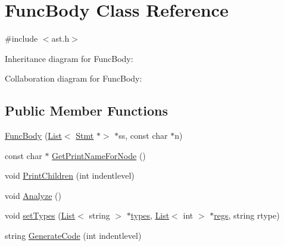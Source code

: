 \hypertarget{class_func_body}{}\section{Func\+Body Class Reference}
\label{class_func_body}


{\ttfamily \#include $<$ast.\+h$>$}



Inheritance diagram for Func\+Body\+:


Collaboration diagram for Func\+Body\+:
\subsection*{Public Member Functions}
\begin{DoxyCompactItemize}
\item 
\hyperlink{class_func_body_a13878f3d52215a31d38a6a593d29fe7a}{Func\+Body} (\hyperlink{class_list}{List}$<$ \hyperlink{class_stmt}{Stmt} $\ast$$>$ $\ast$ss, const char $\ast$n)
\item 
const char $\ast$ \hyperlink{class_func_body_ae2e7c93a201a73256289ecbb59455961}{Get\+Print\+Name\+For\+Node} ()
\item 
void \hyperlink{class_func_body_a6e42023a04da72f19901550f910b2e35}{Print\+Children} (int indentlevel)
\item 
void \hyperlink{class_func_body_a6114d98f4cd6e0341cb8662750266477}{Analyze} ()
\item 
void \hyperlink{class_func_body_a4a2fbd17eb33da81f2ec9d6ff7454463}{set\+Types} (\hyperlink{class_list}{List}$<$ string $>$ $\ast$\hyperlink{class_func_body_ab658c76bb42d23b067c1b1860ddcf9f9}{types}, \hyperlink{class_list}{List}$<$ int $>$ $\ast$\hyperlink{class_func_body_a48a90d46d3c6f767f1a6595c312af970}{regs}, string rtype)
\item 
string \hyperlink{class_func_body_ade15e61124358e79682a8a78dd92f064}{Generate\+Code} (int indentlevel)
\end{DoxyCompactItemize}

